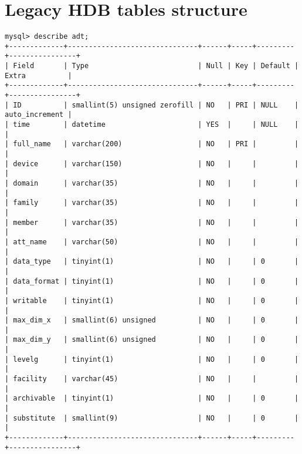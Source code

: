 \documentclass[11pt,a4paper]{article}
\begin{document}
\section{Legacy HDB tables structure}
\label{app:legacyhdb}
{\footnotesize
	\begin{Verbatim}
mysql> describe adt;
+-------------+-------------------------------+------+-----+---------+----------------+
| Field       | Type                          | Null | Key | Default | Extra          |
+-------------+-------------------------------+------+-----+---------+----------------+
| ID          | smallint(5) unsigned zerofill | NO   | PRI | NULL    | auto_increment |
| time        | datetime                      | YES  |     | NULL    |                |
| full_name   | varchar(200)                  | NO   | PRI |         |                |
| device      | varchar(150)                  | NO   |     |         |                |
| domain      | varchar(35)                   | NO   |     |         |                |
| family      | varchar(35)                   | NO   |     |         |                |
| member      | varchar(35)                   | NO   |     |         |                |
| att_name    | varchar(50)                   | NO   |     |         |                |
| data_type   | tinyint(1)                    | NO   |     | 0       |                |
| data_format | tinyint(1)                    | NO   |     | 0       |                |
| writable    | tinyint(1)                    | NO   |     | 0       |                |
| max_dim_x   | smallint(6) unsigned          | NO   |     | 0       |                |
| max_dim_y   | smallint(6) unsigned          | NO   |     | 0       |                |
| levelg      | tinyint(1)                    | NO   |     | 0       |                |
| facility    | varchar(45)                   | NO   |     |         |                |
| archivable  | tinyint(1)                    | NO   |     | 0       |                |
| substitute  | smallint(9)                   | NO   |     | 0       |                |
+-------------+-------------------------------+------+-----+---------+----------------+
	\end{Verbatim}
}
\end{document}
